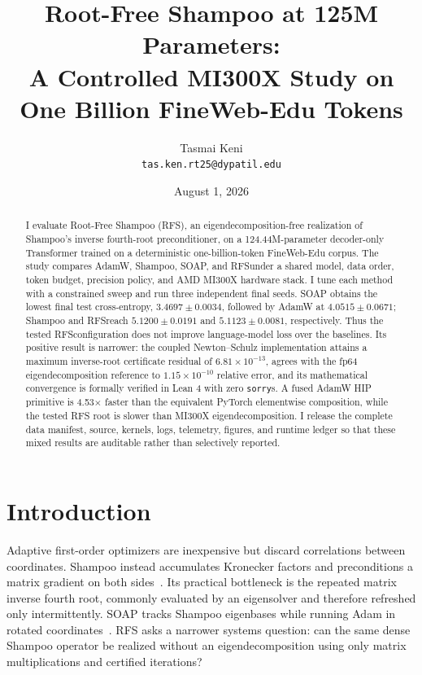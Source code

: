 \documentclass[10pt]{article}
\title{Root-Free Shampoo at 125M Parameters:\\A Controlled MI300X Study on One Billion FineWeb-Edu Tokens}
\author{Tasmai Keni\\\texttt{tas.ken.rt25@dypatil.edu}}
\date{August 1, 2026}
\newcommand{\RFS}{\textsc{RFS}}
\begin{document}
\maketitle

\begin{abstract}
I evaluate Root-Free Shampoo (\RFS), an eigendecomposition-free realization of
Shampoo's inverse fourth-root preconditioner, on a 124.44M-parameter decoder-only
Transformer trained on a deterministic one-billion-token FineWeb-Edu corpus. The
study compares AdamW, Shampoo, SOAP, and \RFS under a shared model, data order,
token budget, precision policy, and AMD MI300X hardware stack. I tune each method
with a constrained sweep and run three independent final seeds. SOAP obtains the
lowest final test cross-entropy, $3.4697\pm0.0034$, followed by AdamW at
$4.0515\pm0.0671$; Shampoo and \RFS reach $5.1200\pm0.0191$ and
$5.1123\pm0.0081$, respectively. Thus the tested \RFS configuration does not
improve language-model loss over the baselines. Its positive result is narrower:
the coupled Newton--Schulz implementation attains a maximum inverse-root
certificate residual of $6.81\times10^{-13}$, agrees with the fp64
eigendecomposition reference to $1.15\times10^{-10}$ relative error, and its
mathematical convergence is formally verified in Lean 4 with zero \texttt{sorry}s. A fused
AdamW HIP primitive is 4.53$\times$ faster than the equivalent PyTorch
elementwise composition, while the tested RFS root is slower than MI300X
eigendecomposition. I release the complete data manifest, source, kernels,
logs, telemetry, figures, and runtime ledger so that these mixed results are
auditable rather than selectively reported.
\end{abstract}

\section{Introduction}
Adaptive first-order optimizers are inexpensive but discard correlations between
coordinates. Shampoo instead accumulates Kronecker factors and preconditions a
matrix gradient on both sides~\citep{gupta2018shampoo}. Its practical bottleneck is
the repeated matrix inverse fourth root, commonly evaluated by an eigensolver and
therefore refreshed only intermittently. SOAP tracks Shampoo eigenbases while
running Adam in rotated coordinates~\citep{vyas2024soap}. \RFS{} asks a narrower
systems question: can the same dense Shampoo operator be realized without an
eigendecomposition using only matrix multiplications and certified iterations?
\end{document}
